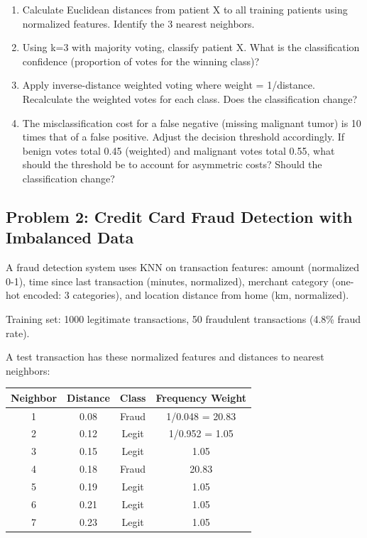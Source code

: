 \documentclass[12pt]{article}
\begin{document}
\begin{enumerate}[label=(\alph*)]
\item Calculate Euclidean distances from patient X to all training patients using normalized features. Identify the 3 nearest neighbors.

\item Using k=3 with majority voting, classify patient X. What is the classification confidence (proportion of votes for the winning class)?

\item Apply inverse-distance weighted voting where weight = 1/distance. Recalculate the weighted votes for each class. Does the classification change?

\item The misclassification cost for a false negative (missing malignant tumor) is 10 times that of a false positive. Adjust the decision threshold accordingly. If benign votes total 0.45 (weighted) and malignant votes total 0.55, what should the threshold be to account for asymmetric costs? Should the classification change?
\end{enumerate}

\subsection*{Problem 2: Credit Card Fraud Detection with Imbalanced Data}

A fraud detection system uses KNN on transaction features: amount (normalized 0-1), time since last transaction (minutes, normalized), merchant category (one-hot encoded: 3 categories), and location distance from home (km, normalized).

Training set: 1000 legitimate transactions, 50 fraudulent transactions (4.8\% fraud rate).

A test transaction has these normalized features and distances to nearest neighbors:

\begin{center}
\begin{tabular}{cccc}
\toprule
Neighbor & Distance & Class & Frequency Weight \\
\midrule
1 & 0.08 & Fraud & 1/0.048 = 20.83 \\
2 & 0.12 & Legit & 1/0.952 = 1.05 \\
3 & 0.15 & Legit & 1.05 \\
4 & 0.18 & Fraud & 20.83 \\
5 & 0.19 & Legit & 1.05 \\
6 & 0.21 & Legit & 1.05 \\
7 & 0.23 & Legit & 1.05 \\
\bottomrule
\end{tabular}
\end{center}
\end{document}
